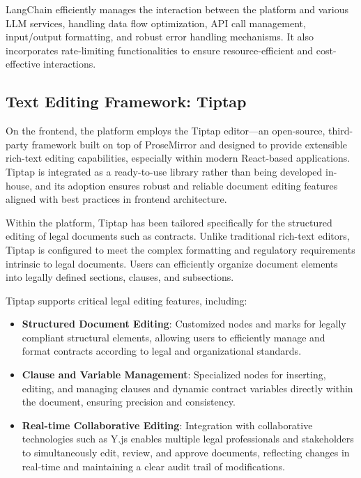 LangChain efficiently manages the interaction between the platform and various LLM services, handling data flow optimization, API call management, input/output formatting, and robust error handling mechanisms. It also incorporates rate-limiting functionalities to ensure resource-efficient and cost-effective interactions.


\subsection{Text Editing Framework: Tiptap}
On the frontend, the platform employs the Tiptap editor—an open-source, third-party framework built on top of ProseMirror and designed to provide extensible rich-text editing capabilities, especially within modern React-based applications. Tiptap is integrated as a ready-to-use library rather than being developed in-house, and its adoption ensures robust and reliable document editing features aligned with best practices in frontend architecture.\mynewline

Within the platform, Tiptap has been tailored specifically for the structured editing of legal documents such as contracts. Unlike traditional rich-text editors, Tiptap is configured to meet the complex formatting and regulatory requirements intrinsic to legal documents. Users can efficiently organize document elements into legally defined sections, clauses, and subsections.\mynewline

Tiptap supports critical legal editing features, including:

\begin{itemize}
    \item \textbf{Structured Document Editing}: Customized nodes and marks for legally compliant structural elements, allowing users to efficiently manage and format contracts according to legal and organizational standards.
    \item \textbf{Clause and Variable Management}: Specialized nodes for inserting, editing, and managing clauses and dynamic contract variables directly within the document, ensuring precision and consistency.
    \item \textbf{Real-time Collaborative Editing}: Integration with collaborative technologies such as Y.js enables multiple legal professionals and stakeholders to simultaneously edit, review, and approve documents, reflecting changes in real-time and maintaining a clear audit trail of modifications.
\end{itemize}

